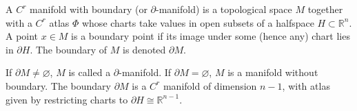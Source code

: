 A $C^r$ manifold with boundary (or $\partial$-manifold) is a topological space $M$ together with a $C^r$ atlas $\Phi$ whose charts take values in open subsets of a halfspace $H \subset \mathbb{R}^n$. A point $x \in M$ is a boundary point if its image under some (hence any) chart lies in $\partial H$. The boundary of $M$ is denoted $\partial M$.

If $\partial M \neq \varnothing$, $M$ is called a $\partial$-manifold. If $\partial M = \varnothing$, $M$ is a manifold without boundary. The boundary $\partial M$ is a $C^r$ manifold of dimension $n-1$, with atlas given by restricting charts to $\partial H \cong \mathbb{R}^{n-1}$.
